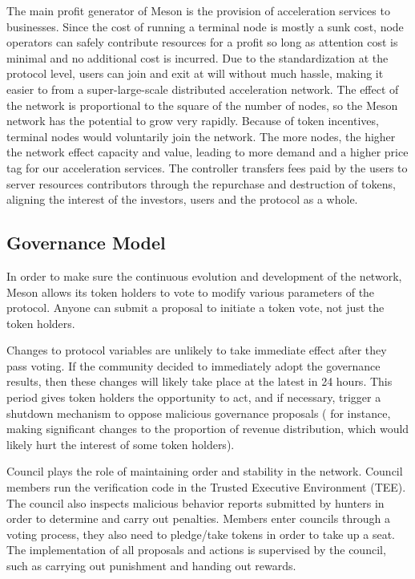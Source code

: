 \documentclass[12pt, a4paper, unicode]{report}
\begin{document}
    The main profit generator of Meson is the provision of acceleration services to businesses. Since the cost of running a terminal node is mostly a sunk cost, node operators can safely contribute resources for a profit so long as attention cost is minimal and no additional cost is incurred. Due to the standardization at the protocol level, users can join and exit at will without much hassle, making it easier to from a super-large-scale distributed acceleration network. The effect of the network is proportional to the square of the number of nodes, so the Meson network has the potential to grow very rapidly. Because of token incentives, terminal nodes would voluntarily join the network. The more nodes, the higher the network effect capacity and value, leading to more demand and a higher price tag for our acceleration services. The controller transfers fees paid by the users to server resources contributors through the repurchase and destruction of tokens, aligning the interest of the investors, users and the protocol as a whole.


    \subsection{Governance Model}
     
    In order to make sure the continuous evolution and development of the network, Meson allows its token holders to vote to modify various parameters of the protocol. Anyone can submit a proposal to initiate a token vote, not just the token holders.

    Changes to protocol variables are unlikely to take immediate effect after they pass voting. If the community decided to immediately adopt the governance results, then these changes will likely take place at the latest in 24 hours. This period gives token holders the opportunity to act, and if necessary, trigger a shutdown mechanism to oppose malicious governance proposals ( for instance, making significant changes to the proportion of revenue distribution, which would likely hurt the interest of some token holders).
    
    Council plays the role of maintaining order and stability in the network. Council members run the verification code in the Trusted Executive Environment (TEE). The council also inspects malicious behavior reports submitted by hunters in order to determine and carry out penalties. Members enter councils through a voting process, they also need to pledge/take tokens in order to take up a seat. The implementation of all proposals and actions is supervised by the council, such as carrying out punishment and handing out rewards.
\end{document}
